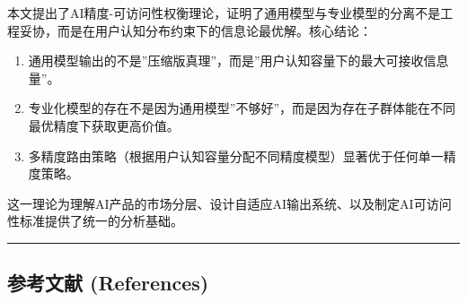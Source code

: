 \documentclass[UTF8, fontset=fandol]{ctexart}
\providecommand{\tightlist}{%
  \setlength{\itemsep}{0pt}\setlength{\parskip}{0pt}}
\begin{document}
本文提出了AI精度-可访问性权衡理论，证明了通用模型与专业模型的分离不是工程妥协，而是在用户认知分布约束下的信息论最优解。核心结论：

\begin{enumerate}
\def\labelenumi{\arabic{enumi}.}
\tightlist
\item
  通用模型输出的不是''压缩版真理''，而是''用户认知容量下的最大可接收信息量''。
\item
  专业化模型的存在不是因为通用模型''不够好''，而是因为存在子群体能在不同最优精度下获取更高价值。
\item
  多精度路由策略（根据用户认知容量分配不同精度模型）显著优于任何单一精度策略。
\end{enumerate}

这一理论为理解AI产品的市场分层、设计自适应AI输出系统、以及制定AI可访问性标准提供了统一的分析基础。

\begin{center}\rule{0.5\linewidth}{0.5pt}\end{center}

\subsection{参考文献
(References)}\label{ux53c2ux8003ux6587ux732e-references}
\end{document}
